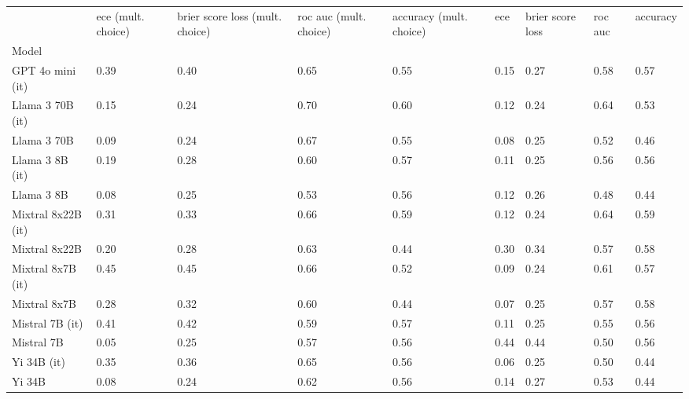 \begin{tabular}{lllllllll}
\toprule
 & ece (mult. choice) & brier score loss (mult. choice) & roc auc (mult. choice) & accuracy (mult. choice) & ece & brier score loss & roc auc & accuracy \\
Model &  &  &  &  &  &  &  &  \\
\midrule
GPT 4o mini (it) & 0.39 & 0.40 & 0.65 & 0.55 & 0.15 & 0.27 & 0.58 & 0.57 \\
Llama 3 70B (it) & 0.15 & \cellcolor{cyan!22.6} 0.24 & \cellcolor{cyan!25.0} 0.70 & \cellcolor{cyan!25.0} 0.60 & 0.12 & \cellcolor{cyan!22.5} 0.24 & \cellcolor{cyan!25.0} 0.64 & 0.53 \\
Llama 3 70B & 0.09 & \cellcolor{cyan!21.4} 0.24 & 0.67 & 0.55 & 0.08 & \cellcolor{cyan!12.4} 0.25 & 0.52 & 0.46 \\
Llama 3 8B (it) & 0.19 & 0.28 & 0.60 & 0.57 & 0.11 & \cellcolor{cyan!12.4} 0.25 & 0.56 & 0.56 \\
Llama 3 8B & 0.08 & \cellcolor{cyan!7.1} 0.25 & 0.53 & 0.56 & 0.12 & 0.26 & \cellcolor{orange!25.0} 0.48 & \cellcolor{orange!25.0} 0.44 \\
Mixtral 8x22B (it) & 0.31 & 0.33 & 0.66 & \cellcolor{cyan!17.1} 0.59 & 0.12 & \cellcolor{cyan!23.7} 0.24 & \cellcolor{cyan!23.5} 0.64 & \cellcolor{cyan!25.0} 0.59 \\
Mixtral 8x22B & 0.20 & 0.28 & 0.63 & \cellcolor{orange!25.0} 0.44 & 0.30 & 0.34 & 0.57 & \cellcolor{cyan!2.4} 0.58 \\
Mixtral 8x7B (it) & \cellcolor{orange!25.0} 0.45 & \cellcolor{orange!25.0} 0.45 & 0.66 & 0.52 & 0.09 & \cellcolor{cyan!25.0} 0.24 & 0.61 & 0.57 \\
Mixtral 8x7B & 0.28 & 0.32 & 0.60 & \cellcolor{orange!25.0} 0.44 & 0.07 & \cellcolor{cyan!16.2} 0.25 & 0.57 & \cellcolor{cyan!2.4} 0.58 \\
Mistral 7B (it) & \cellcolor{orange!2.7} 0.41 & 0.42 & 0.59 & 0.57 & 0.11 & \cellcolor{cyan!11.2} 0.25 & 0.55 & 0.56 \\
Mistral 7B & \cellcolor{cyan!22.5} 0.05 & \cellcolor{cyan!14.2} 0.25 & 0.57 & 0.56 & \cellcolor{orange!25.0} 0.44 & \cellcolor{orange!25.0} 0.44 & 0.50 & 0.56 \\
Yi 34B (it) & 0.35 & 0.36 & 0.65 & 0.56 & \cellcolor{cyan!3.7} 0.06 & \cellcolor{cyan!11.2} 0.25 & 0.50 & \cellcolor{orange!25.0} 0.44 \\
Yi 34B & \cellcolor{cyan!4.5} 0.08 & \cellcolor{cyan!25.0} 0.24 & 0.62 & 0.56 & 0.14 & 0.27 & 0.53 & \cellcolor{orange!25.0} 0.44 \\

\end{tabular}
